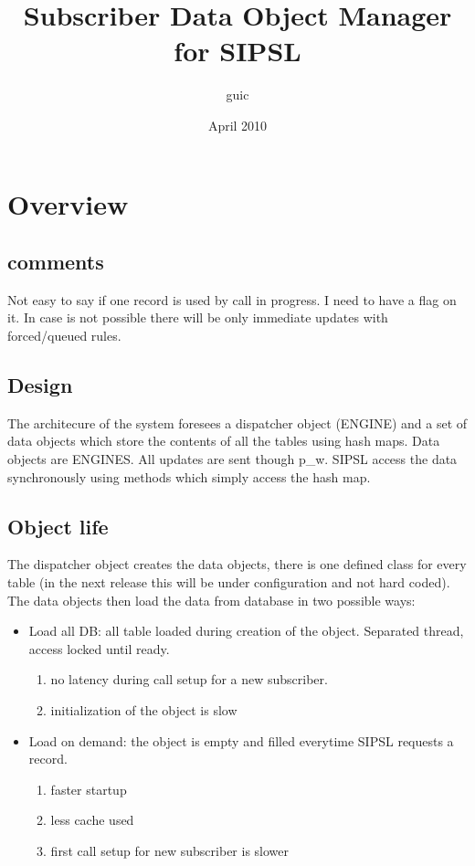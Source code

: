 \documentclass[a4paper]{article}
\title{Subscriber Data Object Manager for SIPSL}
\author{guic}
\date{April 2010}
\begin{document}
	\small
	\maketitle
\section{Overview}

\subsection{comments}
Not easy to say if one record is used by call in progress. I need to have a
flag on it.
In case is not possible there will be only immediate updates with forced/queued
rules.

\subsection{Design}
The architecure of the system foresees a dispatcher object (ENGINE) and a set of data objects which store the contents of all the tables using hash maps.
Data objects are ENGINES.
All updates are sent though p\_w. SIPSL access the data synchronously using methods which simply access the hash map. 

\subsection{Object life}

The dispatcher object creates the data objects, there is one defined class for
every table (in the next release this will be under configuration and not hard coded).
The data objects then load the data from database in two possible ways:

\begin{itemize}
   \item Load all DB: all table loaded during creation of the object. Separated
   thread, access locked until ready.
    \begin{enumerate}
            \item no latency during call setup for a new subscriber.
            \item initialization of the object is slow
    \end{enumerate}
   \item Load on demand: the object is empty and filled everytime SIPSL
   requests a record.
       \begin{enumerate}
            \item faster startup
            \item less cache used
            \item first call setup for new subscriber is slower
    \end{enumerate}
\end{itemize}
\end{document}
